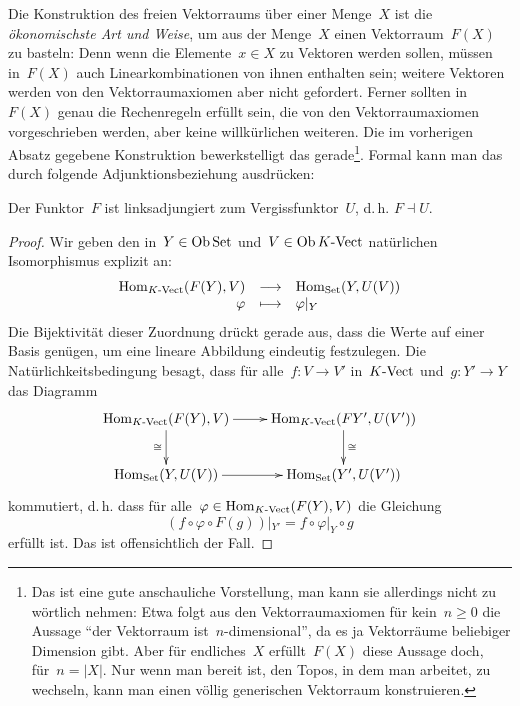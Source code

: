 Die Konstruktion des freien Vektorraums über einer Menge~$X$ ist die
\emph{ökonomischste Art und Weise}, um aus der Menge~$X$ einen
Vektorraum~$F(X)$ zu basteln: Denn wenn die Elemente~$x \in X$ zu Vektoren
werden sollen, müssen in~$F(X)$ auch Linearkombinationen von ihnen enthalten
sein; weitere Vektoren werden von den Vektorraumaxiomen aber nicht gefordert.
Ferner sollten in~$F(X)$ genau die Rechenregeln erfüllt sein, die von den
Vektorraumaxiomen vorgeschrieben werden, aber keine willkürlichen
weiteren. Die im vorherigen Absatz gegebene Konstruktion
bewerkstelligt das gerade\footnote{Das ist eine gute anschauliche Vorstellung, man kann sie
allerdings nicht zu wörtlich nehmen: Etwa folgt aus den Vektorraumaxiomen für
kein~$n \geq 0$ die Aussage "`der Vektorraum ist~$n$-dimensional"', da es ja
Vektorräume beliebiger Dimension gibt. Aber für endliches~$X$ erfüllt~$F(X)$
diese Aussage doch, für~$n = |X|$. Nur wenn man bereit ist, den Topos, in dem man
arbeitet, zu wechseln, kann man einen völlig generischen Vektorraum
konstruieren.}. Formal kann man das durch folgende Adjunktionsbeziehung
ausdrücken:
\begin{prop}Der Funktor~$F$ ist
linksadjungiert zum Vergissfunktor~$U$, d.\,h. $F \dashv U$.
\end{prop}
\begin{proof}
Wir geben den in~$Y \in \operatorname{Ob}\mathrm{Set}$ und~$V \in \operatorname{Ob}{K\text{-}\mathrm{Vect}}$ natürlichen
Isomorphismus explizit an:
\[ \begin{array}{@{}rcl@{}}
  \Hom_{\Vect{K}}(F(Y), V) &\longrightarrow& \Hom_\Set(Y, U(V)) \\
  \varphi &\longmapsto& \varphi|_Y
\end{array} \]
Die Bijektivität dieser Zuordnung drückt gerade aus, dass die Werte auf einer
Basis genügen, um eine lineare Abbildung eindeutig festzulegen. Die
Natürlichkeitsbedingung besagt, dass für alle~$f:V \to V'$ in~${K\text{-}\mathrm{Vect}}$ und~$g:Y' \to Y$
das Diagramm
\[ \xymatrix{
  \Hom_{\Vect{K}}(F(Y),V) \ar[r] \ar[d]_\cong & \Hom_{\Vect{K}}(FY',U(V')) \ar[d]^\cong \\
  \Hom_\Set(Y,U(V)) \ar[r] & \Hom_\Set(Y',U(V'))
} \]
kommutiert, d.\,h. dass für alle~$\varphi \in \mathrm{Hom}_{{K\text{-}\mathrm{Vect}}}(F(Y),V)$ die Gleichung
\[
  (f \circ \varphi \circ F(g))|_{Y'} = f \circ \varphi|_Y \circ g
\]
erfüllt ist. Das ist offensichtlich der Fall.
\end{proof}



